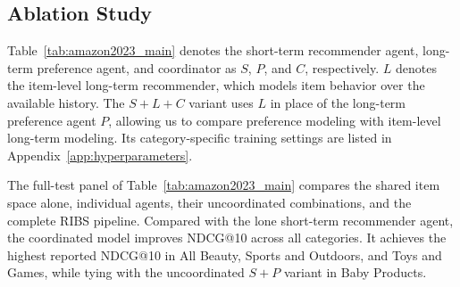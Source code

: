 ﻿\documentclass[sigconf,anonymous,review]{acmart}
\begin{document}
\subsection{Ablation Study}

\label{sec:component_experiments}

Table~\ref{tab:amazon2023_main} denotes the short-term recommender agent, long-term preference agent, and coordinator as $S$, $P$, and $C$, respectively. $L$ denotes the item-level long-term recommender, which models item behavior over the available history. The $S+L+C$ variant uses $L$ in place of the long-term preference agent $P$, allowing us to compare preference modeling with item-level long-term modeling. Its category-specific training settings are listed in Appendix~\ref{app:hyperparameters}.


The full-test panel of Table~\ref{tab:amazon2023_main} compares the shared item space alone, individual agents, their uncoordinated combinations, and the complete RIBS pipeline. Compared with the lone short-term recommender agent, the coordinated model improves NDCG@10 across all categories. It achieves the highest reported NDCG@10 in All Beauty, Sports and Outdoors, and Toys and Games, while tying with the uncoordinated $S+P$ variant in Baby Products.
\end{document}
